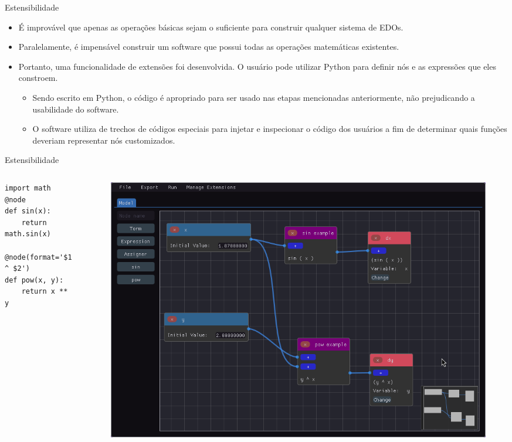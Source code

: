 \begin{frame}[fragile]{Estensibilidade}
    \begin{itemize}
        \item É improvável que apenas as operações básicas sejam o suficiente para construir qualquer sistema de EDOs.
        \item Paralelamente, é impensável construir um software que possui todas as operações matemáticas existentes.
        \item Portanto, uma funcionalidade de extensões foi desenvolvida. O usuário pode utilizar Python para definir nós e as expressões que eles constroem.
        \begin{itemize}
            \item Sendo escrito em Python, o código é apropriado para ser usado nas etapas mencionadas anteriormente, não prejudicando a usabilidade do software.
            \item O software utiliza de trechos de códigos especiais para injetar e inspecionar o código dos usuários a fim de determinar quais funções deveriam representar nós customizados.
        \end{itemize}
    \end{itemize}
\end{frame}

\begin{frame}[fragile]{Estensibilidade}
    \begin{columns}
        \begin{column}{.3\textwidth}
            \begin{verbatim}
import math
@node
def sin(x):
    return math.sin(x)

@node(format='$1 ^ $2')
def pow(x, y):
    return x ** y
            \end{verbatim}
        \end{column}
        \begin{column}{.7\textwidth}
            \begin{figure}
                \centering
                \includegraphics[width=\textwidth]{contents/imgs/ode-designer/ext-sin-pow.png}
            \end{figure}
        \end{column}
    \end{columns}
\end{frame}
